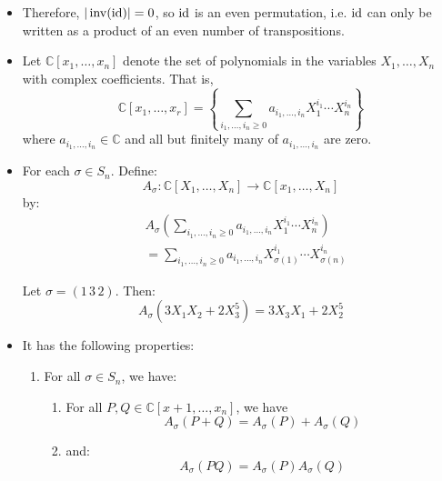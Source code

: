 \begin{itemize}
    \item Therefore, $|\operatorname{inv}(\text{id})|=0$, so $\text{id}$ is an even permutation, i.e. $\text{id}$ can only be written as a product of an even number of transpositions.
    \item Let $\mathbb{C}[x_1,\dots,x_n]$ denote the set of polynomials in the variables $X_1,\dots,X_n$ with complex coefficients. That is,
        \begin{equation}
            \mathbb{C}[x_1,\dots,x_r] = \left\{ \sum_{i_1,\dots,i_n \ge 0} a_{i_1,\dots, i_n} X_1^{i_1}\cdots X_n^{i_n}\right\}
        \end{equation}
        where $a_{i_1,\dots,i_n} \in \mathbb{C}$ and all but finitely many of $a_{i_1,\dots , i_n}$ are zero.
        \vspace{2mm}

    \item For each $\sigma \in S_n$. Define:
        \begin{equation}
            A_\sigma: \mathbb{C}[X_1,\dots,X_n] \rightarrow \mathbb{C} [x_1,\dots,X_n]
        \end{equation}
    by:
    \begin{align}
        & A_\sigma \left(\sum_{i_1,\dots,i_n \ge 0} a_{i_1,\dots,i_n} X_1^{i_1}\cdots X_n^{i_n}\right) \\ 
        &= \sum_{i_1,\dots, i_n \ge 0} a_{i_1,\dots,i_n} X_{\sigma(1)}^{i_1} \cdots  X_{\sigma(n)}^{i_n} 
    \end{align}
    \begin{example}
        Let $\sigma = (1\,3\,2)$. Then:
        \begin{equation}
            A_\sigma (3X_1X_2 + 2X_3^5) = 3X_3X_1 + 2X_2^5
        \end{equation}
    \end{example}
    \item It has the following properties:
    \begin{enumerate}
        \item For all $\sigma \in S_n$, we have:
        \begin{enumerate}
            \item For all $P,Q \in \mathbb{C}[x+1,\dots, x_n]$, we have 
            $$A_\sigma(P+Q) = A_\sigma(P) + A_\sigma(Q)$$
            \item and:
            \begin{equation}
                A_\sigma(PQ) = A_\sigma(P)A_\sigma(Q)
            \end{equation}
        \end{enumerate}


\end{enumerate}
\end{itemize}
